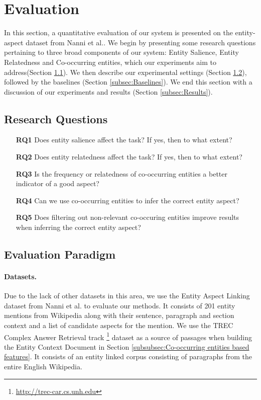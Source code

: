 \section{Evaluation}
\label{sec:Evaluation}
In this section, a quantitative evaluation of our system is presented on the entity-aspect dataset from Nanni et al.\cite{nanni2018entity}. We begin by presenting some research questions pertaining to three broad components of our system: Entity Salience, Entity Relatedness and Co-occurring entities, which our experiments aim to address(Section \ref{subsec:Research Questions}). We then describe our experimental settings (Section \ref{subsec:Evaluation Paradigm}), followed by the baselines (Section \ref{subsec:Baselines}). We end this section with a discussion of our experiments and results (Section \ref{subsec:Results}).

\subsection{Research Questions}
\label{subsec:Research Questions}

\begin{itemize}
\item[\textbf{RQ1}] Does entity salience affect the task? If yes, then to what extent?
\item[\textbf{RQ2}] Does entity relatedness affect the task? If yes, then to what extent? 
\item[\textbf{RQ3}] Is the frequency or relatedness of co-occurring entities a better indicator of a good aspect?
\item[\textbf{RQ4}] Can we use co-occurring entities to infer the correct entity aspect?
\item[\textbf{RQ5}] Does filtering out non-relevant co-occuring entities improve results when inferring the correct entity aspect?
\end{itemize}

\subsection{Evaluation Paradigm}
\label{subsec:Evaluation Paradigm}

\paragraph{\textbf{Datasets.}}
Due to the lack of other datasets in this area, we use the Entity Aspect Linking dataset from Nanni et al.\cite{nanni2018entity} to evaluate our methods. It consists of 201 entity mentions from Wikipedia along with their sentence, paragraph and section context and a list of candidate aspects for the mention.  We use the TREC Complex Answer Retrieval track \cite{dietz2018trec}\footnote{\url{http://trec-car.cs.unh.edu}} dataset as a source of passages when building the Entity Context Document in Section \ref{subsubsec:Co-occurring entities based features}. It consists of an entity linked corpus consisting of paragraphs from the entire English Wikipedia.

